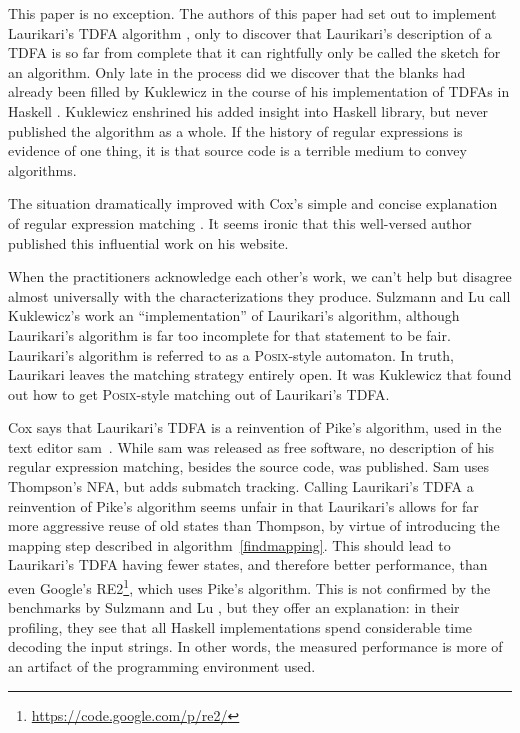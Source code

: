 \documentclass[11pt,a4paper,twoside,openright]{Thesis}
\theoremstyle{definition}
\begin{document}
This paper is no exception. The authors of this paper had set out to implement
Laurikari's TDFA algorithm \cite{Laur00a}, only to discover that Laurikari's
description of a TDFA is so far from complete that it can rightfully only be
called the sketch for an algorithm. Only late in the process did we discover
that the blanks had already been filled by Kuklewicz in the course of his
implementation of TDFAs in Haskell \cite{Kukl07a}. Kuklewicz enshrined his
added insight into Haskell library, but never published the algorithm as a
whole. If the history of regular expressions is evidence of one thing, it is
that source code is a terrible medium to convey algorithms. 

The situation dramatically improved with Cox's simple and concise
explanation of regular expression matching \cite{Cox07a}. It seems
ironic that this well-versed author published this influential work
on his website.

When the practitioners acknowledge each other's work, we can't
help but disagree almost universally with the characterizations they
produce. Sulzmann and Lu \cite{Sulz12a} call Kuklewicz's
work an ``implementation'' of Laurikari's algorithm, although Laurikari's
algorithm is far too incomplete for that statement to be fair. Laurikari's
algorithm is referred to as a \textsc{Posix}-style automaton. In truth, Laurikari
leaves the matching strategy entirely open. It was Kuklewicz that
found out how to get \textsc{Posix}-style matching out of Laurikari's TDFA. 

Cox says that Laurikari's TDFA is a reinvention of Pike's algorithm,
used in the text editor sam~\cite{Pike87a}.  While sam was released
as free software, no description of his regular expression matching,
besides the source code, was published.  Sam uses Thompson's NFA,
but adds submatch tracking. Calling Laurikari's TDFA a reinvention of Pike's
algorithm seems unfair in that Laurikari's allows for far more aggressive reuse
of old states than Thompson, by virtue of introducing the mapping step 
described in algorithm~\ref{findmapping}. This should lead to Laurikari's TDFA
having fewer
states, and therefore better performance, than even Google's
RE2\footnote{\url{https://code.google.com/p/re2/}}, which uses Pike's
algorithm. This is not confirmed by the benchmarks by Sulzmann and Lu
\cite{Sulz12a}, but they offer an explanation: in their profiling, they see
that all Haskell implementations spend considerable time decoding the input
strings. In other words, the measured performance is more of an artifact of the
programming environment used.
\end{document}
